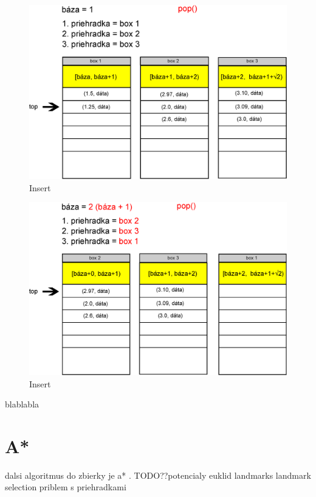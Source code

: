 \begin{figure}[h]
\centering
\includegraphics[width=\textwidth]{./img/priehradky_naplnene_default_i_d1.eps}
\caption{Insert}
\label{fig:priehradky_i_d1}
\end{figure}

\begin{figure}[h]
\centering
\includegraphics[width=\textwidth]{./img/priehradky_naplnene_default_i_d2.eps}
\caption{Insert}
\label{fig:priehradky_i_d2}
\end{figure}

blablabla


\section{A*}
dalsi algoritmus do zbierky je a* \cite{astar72}.
TODO??potencialy euklid landmarks landmark selection priblem s priehradkami